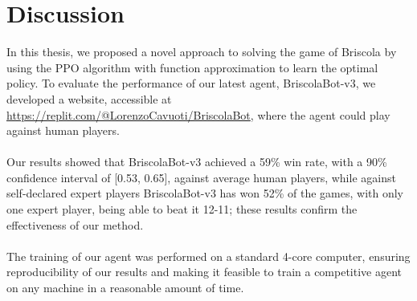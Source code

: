 \chapter{Discussion}
In this thesis, we proposed a novel approach to solving the game of Briscola by using the PPO algorithm with function approximation to learn the optimal policy. To evaluate the performance of our latest agent, BriscolaBot-v3, we developed a website, accessible at \url{https://replit.com/@LorenzoCavuoti/BriscolaBot}, where the agent could play against human players.\\\\
Our results showed that BriscolaBot-v3 achieved a 59\% win rate, with a 90\% confidence interval of [0.53, 0.65], against average human players, while against self-declared expert players BriscolaBot-v3 has won 52\% of the games, with only one expert player, being able to beat it 12-11; these results confirm the effectiveness of our method.\\\\
The training of our agent was performed on a standard 4-core computer, ensuring reproducibility of our results and making it feasible to train a competitive agent on any machine in a reasonable amount of time.

